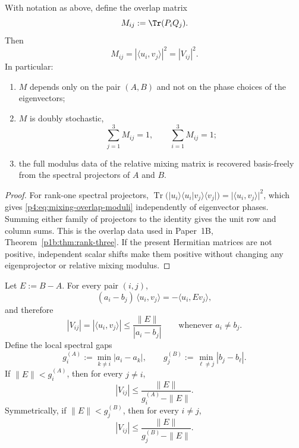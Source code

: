 \documentclass[12pt,a4paper]{article}
\begin{document}
\begin{theorem}
\label{p4:thm:projector-overlap-mixing}
With notation as above, define the overlap matrix
\begin{equation}
\label{p4:eq:mixing-overlap-matrix}
M_{ij}:=\Tr(P_iQ_j).
\end{equation}
Then
\begin{equation}
\label{p4:eq:mixing-overlap-moduli}
M_{ij}=|\langle u_i,v_j\rangle|^2 = |V_{ij}|^2.
\end{equation}
In particular:
\begin{enumerate}
\item $M$ depends only on the pair $(A,B)$ and not on the phase choices of the eigenvectors;
\item $M$ is doubly stochastic,
\[
\sum_{j=1}^3 M_{ij}=1,
\qquad
\sum_{i=1}^3 M_{ij}=1;
\]
\item the full modulus data of the relative mixing matrix is recovered basis-freely from the spectral projectors of $A$ and $B$.
\end{enumerate}
\end{theorem}


\begin{proof}
For rank-one spectral projectors,
$\operatorname{Tr}(|u_i\rangle\langle u_i|v_j\rangle\langle v_j|)
=|\langle u_i,v_j\rangle|^2$, which gives
\eqref{p4:eq:mixing-overlap-moduli} independently of eigenvector phases.
Summing either family of projectors to the identity gives the unit row
and column sums. This is the overlap data used in Paper~1B,
Theorem~\ref{p1b:thm:rank-three}. If the present Hermitian matrices are
not positive, independent scalar shifts make them positive without
changing any eigenprojector or relative mixing modulus.
\end{proof}


\begin{theorem}
\label{p4:thm:gap-controlled-eigenframe-mismatch}
Let $E:=B-A$.
For every pair $(i,j)$,
\begin{equation}
\label{p4:eq:exact-eigenframe-identity}
(a_i-b_j)\,\langle u_i,v_j\rangle
=
-\langle u_i,E v_j\rangle,
\end{equation}
and therefore
\begin{equation}
\label{p4:eq:exact-eigenframe-bound}
|V_{ij}| = |\langle u_i,v_j\rangle|
\le
\frac{\|E\|}{|a_i-b_j|}
\qquad\text{whenever }a_i\neq b_j.
\end{equation}
Define the local spectral gaps
\[
g_i^{(A)}:=\min_{k\neq i}|a_i-a_k|,
\qquad
g_j^{(B)}:=\min_{\ell\neq j}|b_j-b_\ell|.
\]
If $\|E\|<g_i^{(A)}$, then for every $j\neq i$,
\begin{equation}
\label{p4:eq:gap-controlled-offdiag-bound}
|V_{ij}|
\le
\frac{\|E\|}{g_i^{(A)}-\|E\|}.
\end{equation}
Symmetrically, if $\|E\|<g_j^{(B)}$, then for every $i\neq j$,
\begin{equation}
\label{p4:eq:gap-controlled-offdiag-bound-B}
|V_{ij}|
\le
\frac{\|E\|}{g_j^{(B)}-\|E\|}.
\end{equation}
\end{theorem}
\end{document}
